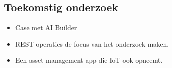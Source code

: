 \documentclass[a0,portrait]{a0poster}
\begin{document}
\begin{multicols}{2}
\section*{Toekomstig onderzoek}
\color{black}

\begin{itemize}
    \item Case met AI Builder
    \item REST operaties de focus van het onderzoek maken.
    \item Een asset management app die IoT ook opneemt.
\end{itemize}



\end{multicols}
\end{document}
